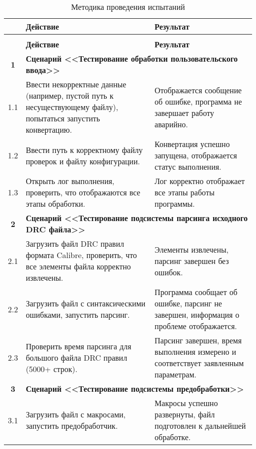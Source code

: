 \begin{longtable}{|c|p{7.5cm}|p{7.5cm}|}
	\caption{Методика проведения испытаний} \label{table:test:method} \\
	\hline
	\textbf{\No} & \textbf{Действие} & \textbf{Результат} \\
	\hline
	\endfirsthead
	\conttable{table:test:method} \\
	\hline
	\textbf{\No} & \textbf{Действие} & \textbf{Результат} \\
	\hline
	\endhead

	\textbf{1}
	& \multicolumn{2}{|l|}{\textbf{
		Сценарий <<Тестирование обработки пользовательского ввода>>}} \\ \hline
	1.1
	& Ввести некорректные данные
	(например, пустой путь к несуществующему файлу),
	попытаться запустить конвертацию.
	& Отображается сообщение об ошибке,
	программа не завершает работу аварийно. \\ \hline

	1.2
	& Ввести путь к корректному файлу проверок и файлу конфигурации.
	& Конвертация успешно запущена, отображается статус выполнения. \\ \hline

	1.3
	& Открыть лог выполнения, проверить, что отображаются все этапы обработки.
	& Лог корректно отображает все этапы работы программы. \\ \hline

	\textbf{2}
	& \multicolumn{2}{|p{15cm}|}{\textbf{Сценарий
		<<Тестирование подсистемы парсинга исходного DRC файла>>}} \\ \hline
	2.1
	& Загрузить файл DRC правил формата Calibre,
	проверить, что все элементы файла корректно извлечены.
	& Элементы извлечены, парсинг завершен без ошибок. \\ \hline

	2.2
	& Загрузить файл с синтаксическими ошибками, запустить парсинг.
	& Программа сообщает об ошибке, парсинг не завершен,
	информация о проблеме отображается. \\ \hline

	2.3
	& Проверить время парсинга для большого файла DRC правил (5000+ строк).
	& Парсинг завершен, время выполнения измерено
	и соответствует заявленным параметрам. \\ \hline

	\textbf{3}
	& \multicolumn{2}{|l|}{\textbf{
		Сценарий <<Тестирование подсистемы предобработки>>}} \\ \hline
	3.1
	& Загрузить файл с макросами, запустить предобработчик.
	& Макросы успешно развернуты,
	файл подготовлен к дальнейшей обработке. \\ \hline


\end{longtable}
